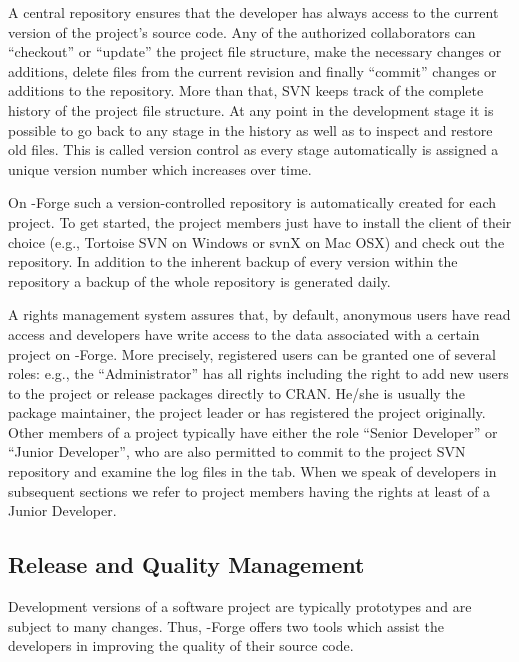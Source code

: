 A central repository ensures that the developer
has always access to the current version of the project's source
code. Any of the authorized collaborators can ``checkout'' or
``update'' the project
file structure, make the necessary changes or additions, delete
files from the current revision and finally ``commit'' changes or additions
to the repository. More than
that, SVN keeps track of the complete history of the project file
structure. At any point in the development stage it is possible to go
back to any stage in the history as well as to inspect and restore old
files. This is called version control as every stage automatically is
assigned a unique version number which increases over time. 

On \R{}-Forge such a version-controlled repository is automatically
created for each project. To get started, the project members just
have to install the client of their choice (e.g., Tortoise SVN on
Windows or svnX on 
Mac OSX) and check out the repository. In addition to the inherent
backup of every version within the repository a backup of the whole
repository is generated daily. 

A rights management system assures that, by default, anonymous users
have read access and developers have write access to the data associated with 
a certain project on \R{}-Forge. More precisely, registered users can
be granted one of several roles: e.g., the ``Administrator'' has
all rights including the right to 
add new users to the project or release packages directly to CRAN.
He/she is usually the package 
maintainer, the project leader or has registered the project originally.
Other members of a project typically have either the role ``Senior 
Developer'' or ``Junior Developer'', who  are also permitted to
commit to the project  
SVN repository and examine the log files in the  tab.
When we speak of developers in subsequent sections we refer to project
members having the rights at least of a Junior Developer.


\subsection{Release and Quality Management}
\label{sec:release_and_quality_management}

Development versions of a software project are typically
prototypes and are subject to many changes. Thus, \R{}-Forge offers
two tools which assist the developers in improving the quality of
their source code.

